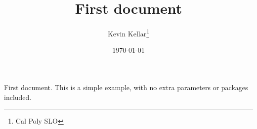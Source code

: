 \documentclass[12pt, letterpaper]{article}
\title{First document}
\author{Kevin Kellar\thanks{Cal Poly SLO}}
\date{\today}
\begin{document}
\maketitle

First document. This is a simple example, with no 
extra parameters or packages included.
\end{document}

